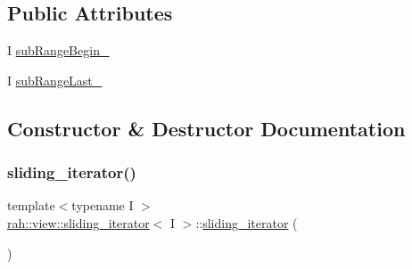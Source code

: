 \subsection*{Public Attributes}
\begin{DoxyCompactItemize}
\item 
I \mbox{\hyperlink{structrah_1_1view_1_1sliding__iterator_a4d921b6315b961a731e955cd57c66046}{sub\+Range\+Begin\+\_\+}}
\item 
I \mbox{\hyperlink{structrah_1_1view_1_1sliding__iterator_a6ad809caec4abec1b0248c86c72c5087}{sub\+Range\+Last\+\_\+}}
\end{DoxyCompactItemize}


\subsection{Constructor \& Destructor Documentation}
\mbox{\label{structrah_1_1view_1_1sliding__iterator_aca6d86f12e1a03d9d4a803538099bf4a}} 
\subsubsection{\texorpdfstring{sliding\_iterator()}{sliding\_iterator()}\hspace{0.1cm}{\footnotesize\ttfamily [1/2]}}
{\footnotesize\ttfamily template$<$typename I $>$ \\
\mbox{\hyperlink{structrah_1_1view_1_1sliding__iterator}{rah\+::view\+::sliding\+\_\+iterator}}$<$ I $>$\+::\mbox{\hyperlink{structrah_1_1view_1_1sliding__iterator}{sliding\+\_\+iterator}} (\begin{DoxyParamCaption}{ }\end{DoxyParamCaption})\hspace{0.3cm}{\ttfamily [default]}}

\mbox{\label{structrah_1_1view_1_1sliding__iterator_a4d2432f2b502f31dce283f11044f3999}} 
